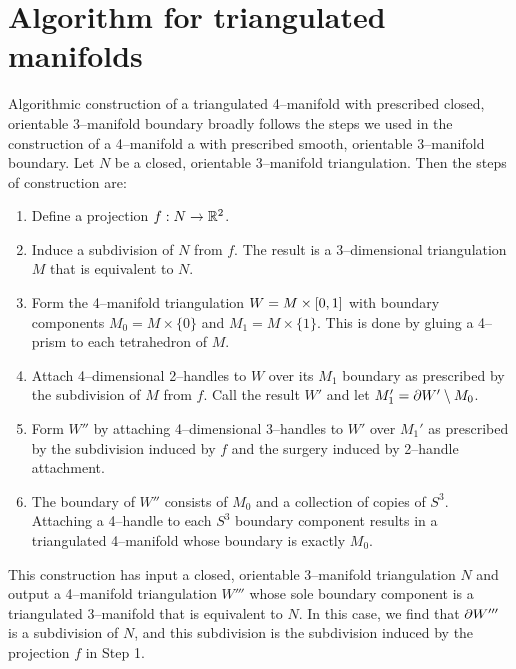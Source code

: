\chapter{Algorithm for triangulated manifolds}
\label{chapter:triangulation}

Algorithmic construction of a triangulated 4--manifold with prescribed closed, orientable 3--manifold boundary broadly follows the steps we used in the construction of a 4--manifold a with prescribed smooth, orientable 3--manifold boundary.
Let $N$ be a closed, orientable 3--manifold triangulation.
Then the steps of construction are:
\begin{enumerate}
	\item Define a projection $f:N\to\mathbb{R}^2$.
	
	\item Induce a subdivision of $N$ from $f$.  The result is a 3--dimensional triangulation $M$ that is equivalent to $N$.
	
	\item Form the 4--manifold triangulation $W=M\times[0,1]$ with boundary components $M_0 = M\times\{0\}$ and $M_1 = M\times\{1\}$.  This is done by gluing a 4--prism to each tetrahedron of $M$.
	
	\item Attach 4--dimensional 2--handles to $W$ over its $M_1$ boundary as prescribed by the subdivision of $M$ from $f$.  Call the result $W'$ and let $M_1'=\partial W' \setminus M_0$.
	
	\item Form $W''$ by attaching 4--dimensional 3--handles to $W'$ over $M_1'$ as prescribed by the subdivision induced by $f$ and the surgery induced by 2--handle attachment.
	
	\item The boundary of $W''$ consists of $M_0$ and a collection of copies of $S^3$. Attaching a 4--handle to each $S^3$ boundary component results in a triangulated 4--manifold whose boundary is exactly $M_0$.
\end{enumerate}

This construction has input a closed, orientable 3--manifold triangulation $N$ and output a 4--manifold triangulation $W'''$ whose sole boundary component is a triangulated 3--manifold that is equivalent to $N$.
In this case, we find that $\partial W'''$ is a subdivision of $N$, and this subdivision is the subdivision induced by the projection $f$ in Step 1.

